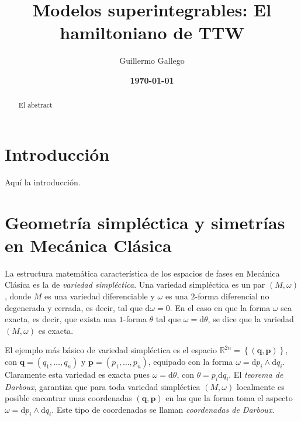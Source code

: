 \documentclass[12pt,a4paper,twoside]{article}
\title{Modelos superintegrables: El hamiltoniano de TTW}
\author{Guillermo Gallego}
\date{\bf \today}
\theoremstyle{definition} \newtheorem{defn}[thm]{Definición}
\theoremstyle{definition} \newtheorem{ejemplo}[thm]{Ejemplo}
\theoremstyle{definition} \newtheorem{ejercicio}[thm]{Ejercicio}
\theoremstyle{remark} \newtheorem*{obs}{Observación}
\def\RR{\mathbb{R}}
\def\dd{\mathrm{d}}
\newcommand{\vect}[1]{\mathbf{#1}}
\begin{document}
\maketitle
\begin{abstract}
  El abstract
\end{abstract}
\newpage

\tableofcontents

\section*{Introducción}
Aquí la introducción.
\section{Geometría simpléctica y simetrías en Mecánica Clásica}
La estructura matemática característica de los espacios de fases en Mecánica Clásica es la de \emph{variedad simpléctica}. Una variedad simpléctica es un par $(M,\omega)$, donde $M$ es una variedad diferenciable y $\omega$ es una $2$-forma diferencial no degenerada y cerrada, es decir, tal que $\dd \omega=0$. En el caso en que la forma $\omega$ sea exacta, es decir, que exista una $1$-forma $\theta$ tal que $\omega=\dd \theta$, se dice que la variedad $(M,\omega)$ es exacta. 

El ejemplo más básico de variedad simpléctica es el espacio $\RR^{2n}=\left\{ (\vect{q},\vect{p}) \right\}$, con $\vect{q}=(q_1,\dots,q_n)$ y $\vect{p}=(p_1,\dots,p_n)$, equipado con la forma $\omega=\dd p_i \wedge \dd q_i$. Claramente esta variedad es exacta pues $\omega=\dd \theta$, con $\theta=p_i \dd q_i$. El \emph{teorema de Darboux}, garantiza que para toda variedad simpléctica $(M,\omega)$ localmente es posible encontrar unas coordenadas $(\vect{q},\vect{p})$ en las que la forma toma el aspecto $\omega=\dd p_i \wedge \dd q_i$. Este tipo de coordenadas se llaman \emph{coordenadas de Darboux}.
\end{document}
